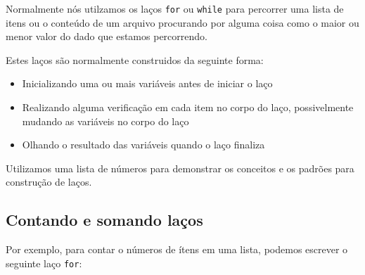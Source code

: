 
Normalmente nós utilzamos os laços {\tt for} ou {\tt while} para percorrer
uma lista de itens ou o conteúdo de um arquivo procurando por alguma coisa
como o maior ou menor valor do dado que estamos percorrendo.


Estes laços são normalmente construidos da seguinte forma:

\begin{itemize}

\item Inicializando uma ou mais variáveis antes de iniciar o laço

\item Realizando alguma verificação em cada item no corpo do laço,
	possivelmente mudando as variáveis no corpo do laço

\item Olhando o resultado das variáveis quando o laço finaliza
\end{itemize}


Utilizamos uma lista de números para demonstrar os conceitos e os padrões
para construção de laços.

\subsection{Contando e somando laços}


Por exemplo, para contar o números de ítens em uma lista, podemos escrever
o seguinte laço {\tt for}:

